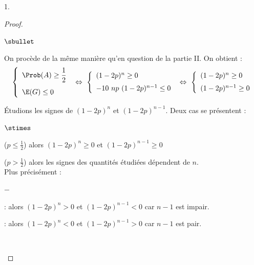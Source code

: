 \documentclass[11pt]{article}%
\begin{document}
\begin{noliste}{1.}
  \begin{proof}~%
    \begin{noliste}{$\sbullet$}
    \item On procède de la même manière qu'en question  de la
      partie II. On obtient :
      \[
      \left\{
        \begin{array}{l}
          \Prob(A) \geq \dfrac{1}{2} 
          \\[.4cm]
          \E(G) \leq 0
        \end{array}
      \right. \ \Leftrightarrow \ \left\{
        \begin{array}{l}
          (1-2p)^n \geq 0 
          \\[.2cm]
          -10 \ np \ (1-2p)^{n-1} \leq 0
        \end{array}
      \right. \ \Leftrightarrow \ \left\{
        \begin{array}{l}
          (1-2p)^n \geq 0 
          \\[.2cm]
          (1-2p)^{n-1} \geq 0
        \end{array}
      \right. 
      \]

    \item Étudions les signes de $(1-2p)^n$ et $(1-2p)^{n-1}$. Deux
      cas se présentent :
      \begin{noliste}{$\stimes$}
      \item {} (\ie $p \leq \frac{1}{2}$)
        alors $(1-2p)^n \geq 0$ et $(1-2p)^{n-1} \geq 0$
      \item {} (\ie $p > \frac{1}{2}$) alors
        les signes des quantités étudiées dépendent de $n$.\\
        Plus précisément :
        \begin{noliste}{$-$}
        \item {} : alors $(1-2p)^n > 0$ et
          $(1-2p)^{n-1} < 0$ car $n-1$ est impair.
        \item {} : alors $(1-2p)^n < 0$ et
          $(1-2p)^{n-1} > 0$ car $n-1$ est pair.
        \end{noliste}
      \end{noliste}
      ~\\[-1.4cm]
    \end{noliste}
  \end{proof}


\end{noliste}
\end{document}
